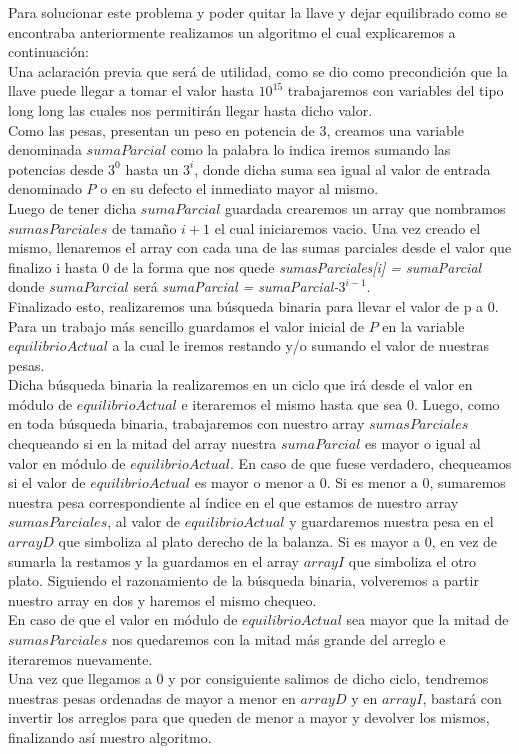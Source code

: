 
Para solucionar este problema y poder quitar la llave y dejar equilibrado como se encontraba anteriormente realizamos un algoritmo el cual explicaremos a continuaci\'on:\\

Una aclaraci\'on previa que ser\'a de utilidad, como se dio como precondici\'on que la llave puede llegar a tomar el valor hasta $10^{15}$ trabajaremos con variables del tipo long long las cuales nos permitir\'an llegar hasta dicho valor.\\

Como las pesas, presentan un peso en potencia de 3, creamos una variable denominada $sumaParcial$ como la palabra lo indica iremos sumando las potencias desde $3^0$ hasta un $3^i$, donde dicha suma sea igual al valor de entrada denominado $P$ o en su defecto el inmediato mayor al mismo.\\

Luego de tener dicha $sumaParcial$ guardada crearemos un array que nombramos $sumasParciales$ de tamaño $i+1$ el cual iniciaremos vacio. Una vez creado el mismo, llenaremos el array con cada una de las sumas parciales desde el valor que finalizo i hasta 0 de la forma que nos quede \textit{sumasParciales[i] = sumaParcial} donde $sumaParcial$ ser\'a \textit{sumaParcial = sumaParcial-$3^{i-1}$}.\\

Finalizado esto, realizaremos una b\'usqueda binaria para llevar el valor de p a 0. Para un trabajo m\'as sencillo guardamos el valor inicial de $P$ en la variable $equilibrioActual$ a la cual le iremos restando y/o sumando el valor de nuestras pesas.\\

Dicha b\'usqueda binaria la realizaremos en un ciclo que ir\'a desde el valor en m\'odulo de $equilibrioActual$ e iteraremos el mismo hasta que sea 0. Luego, como en toda b\'usqueda binaria, trabajaremos con nuestro array $sumasParciales$ chequeando si en la mitad del array nuestra $sumaParcial$ es mayor o igual al valor en m\'odulo de $equilibrioActual$. En caso de que fuese verdadero, chequeamos si el valor de $equilibrioActual$ es mayor o menor a 0. Si es menor a 0, sumaremos nuestra pesa correspondiente al \'indice en el que estamos de nuestro array $sumasParciales$, al valor de $equilibrioActual$ y guardaremos nuestra pesa en el $arrayD$ que simboliza al plato derecho de la balanza. Si es mayor a 0, en vez de sumarla la restamos y la guardamos en el array $arrayI$ que simboliza el otro plato. Siguiendo el razonamiento de la b\'usqueda binaria, volveremos a partir nuestro array en dos y haremos el mismo chequeo.\\

En caso de que el valor en m\'odulo de $equilibrioActual$ sea mayor que la mitad de $sumasParciales$ nos quedaremos con la mitad m\'as grande del arreglo e iteraremos nuevamente.\\

Una vez que llegamos a 0 y por consiguiente salimos de dicho ciclo, tendremos nuestras pesas ordenadas de mayor a menor en $arrayD$ y en $arrayI$, bastar\'a con invertir los arreglos para que queden de menor a mayor y devolver los mismos, finalizando as\'i nuestro algoritmo.\\
